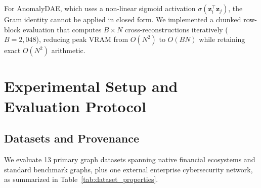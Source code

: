 \documentclass[applsci,article,submit,moreauthors,pdftex]{Definitions/mdpi}
\begin{document}
For AnomalyDAE, which uses a non-linear sigmoid activation $\sigma(\mathbf{z}_i^\top \mathbf{z}_j)$, the Gram identity cannot be applied in closed form. We implemented a chunked row-block evaluation that computes $B \times N$ cross-reconstructions iteratively ($B=2,048$), reducing peak VRAM from $O(N^2)$ to $O(B N)$ while retaining exact $O(N^2)$ arithmetic.

\section{Experimental Setup and Evaluation Protocol}
\label{sec:experimental_setup}

\subsection{Datasets and Provenance}
We evaluate 13 primary graph datasets spanning native financial ecosystems and standard benchmark graphs, plus one external enterprise cybersecurity network, as summarized in Table~\ref{tab:dataset_properties}.
\end{document}
